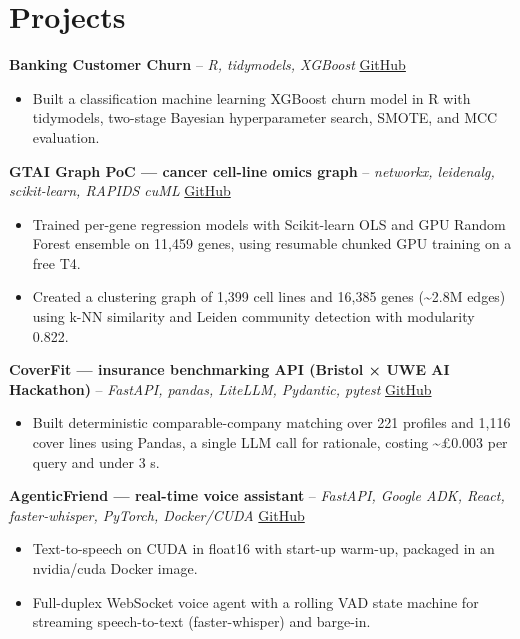 \documentclass[a4paper,11pt]{article}
\begin{document}
\section{Projects}
\noindent\textbf{Banking Customer Churn} -- \textit{R, tidymodels, XGBoost} \hfill \href{https://github.com/Thiruvel-AP/Banking-Customer-Churn-Prediction}{GitHub}
\begin{itemize}
  \item Built a classification machine learning XGBoost churn model in R with tidymodels, two-stage Bayesian hyperparameter search, SMOTE, and MCC evaluation.
\end{itemize}
\vspace{3pt}
\noindent\textbf{GTAI Graph PoC — cancer cell-line omics graph} -- \textit{networkx, leidenalg, scikit-learn, RAPIDS cuML} \hfill \href{https://github.com/Thiruvel-AP/GTAI-GraphPOC}{GitHub}
\begin{itemize}
  \item Trained per-gene regression models with Scikit-learn OLS and GPU Random Forest ensemble on 11,459 genes, using resumable chunked GPU training on a free T4.
  \item Created a clustering graph of 1,399 cell lines and 16,385 genes (\textasciitilde{}2.8M edges) using k-NN similarity and Leiden community detection with modularity 0.822.
\end{itemize}
\vspace{3pt}
\noindent\textbf{CoverFit — insurance benchmarking API (Bristol × UWE AI Hackathon)} -- \textit{FastAPI, pandas, LiteLLM, Pydantic, pytest} \hfill \href{https://github.com/Thiruvel-AP/AIHackathon-Phoenix}{GitHub}
\begin{itemize}
  \item Built deterministic comparable-company matching over 221 profiles and 1,116 cover lines using Pandas, a single LLM call for rationale, costing \textasciitilde{}£0.003 per query and under 3 s.
\end{itemize}
\vspace{3pt}
\noindent\textbf{AgenticFriend — real-time voice assistant} -- \textit{FastAPI, Google ADK, React, faster-whisper, PyTorch, Docker/CUDA} \hfill \href{https://github.com/Thiruvel-AP/adk_multi-agent}{GitHub}
\begin{itemize}
  \item Text-to-speech on CUDA in float16 with start-up warm-up, packaged in an nvidia/cuda Docker image.
  \item Full-duplex WebSocket voice agent with a rolling VAD state machine for streaming speech-to-text (faster-whisper) and barge-in.
\end{itemize}
\end{document}

